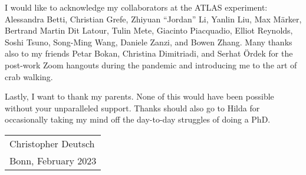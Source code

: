 I would like to acknowledge my collaborators at the ATLAS experiment: Alessandra
Betti, Christian Grefe, Zhiyuan ``Jordan'' Li, Yanlin Liu, Max Märker, Bertrand
Martin Dit Latour, Tulin Mete, Giacinto Piacquadio, Elliot Reynolds, Soshi
Tsuno, Song-Ming Wang, Daniele Zanzi, and Bowen Zhang. Many thanks also to my
\bbtautau friends Petar Bokan, Christina Dimitriadi, and Serhat Ördek for the
post-work Zoom hangouts during the pandemic and introducing me to the art of
crab walking.

Lastly, I want to thank my parents. None of this would have been possible
without your unparalleled support. Thanks should also go to Hilda for
occasionally taking my mind off the day-to-day struggles of doing a PhD.

\vspace{2\baselineskip}

\hfill%
\begin{tabular}{l}
  Christopher Deutsch \\
  Bonn, February 2023
\end{tabular}

